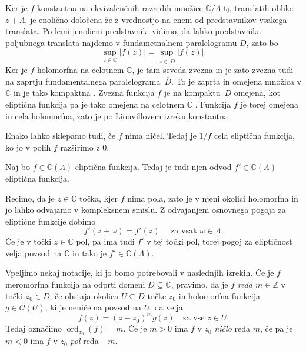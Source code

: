 \documentclass[mat1]{fmfdelo}
\newcommand{\Z}{\mathbb Z}
\newcommand{\C}{\mathbb C}
\newcommand{\elf}{\C(\Lambda)}
\newcommand{\ord}[2]{\operatorname{ord}_{#1}(#2)}
\newcommand{\hol}[1]{\mathcal{O}(#1)}
\newcommand{\olsi}[1]{\,\overline{\!{#1}}} %
\theoremstyle{definition}
\begin{document}
\begin{dokaz}
    Ker je $f$ konstantna na ekvivalenčnih razredih množice $\C/\Lambda$ tj. translatih oblike $z + \Lambda$, je enolično določena že z vrednostjo na enem od predstavnikov vsakega translata. Po lemi \ref{enolicni predstavnik} vidimo, da lahko predstavnika poljubnega translata najdemo v fundametnalnem paralelogramu $D$, zato bo 
    \[
        \sup_{z \in \C} \left\lvert f(z) \right\rvert = \sup_{z \in \olsi{D}} \left\lvert f(z) \right\rvert.
    \]
    Ker je $f$ holomorfna na celotnem $\C$, je tam seveda zvezna in je zato zvezna tudi na zaprtju fundamentalnega paralelograma $\olsi{D}$. To je zaprta in omejena množica v $\C$ in je tako kompaktna \cite[Trditev 2.22]{MrcunTop}. Zvezna funkcija $f$ je na kompaktu $\olsi{D}$ omejena, kot eliptična funkcija pa je tako omejena na celotnem $\C$ \cite[Posledica 2.28]{MrcunTop}. Funkcija $f$ je torej omejena in cela holomorfna, zato je po Liouvillovem izreku konstantna.  
\end{dokaz}

\begin{opomba}
    Enako lahko sklepamo tudi, če $f$ nima ničel. Tedaj je $1/f$ cela eliptična funkcija, ko jo v polih $f$ razširimo z $0$.
\end{opomba}

\begin{lema}
    \label{odvod el. funkcije}
    Naj bo $f \in \elf$ eliptična funkcija. Tedaj je tudi njen odvod $f' \in \elf$ eliptična funkcija.
\end{lema}

\begin{dokaz}
    Recimo, da je $z \in \C$ točka, kjer $f$ nima pola, zato je v njeni okolici holomorfna in jo lahko odvajamo v kompleksnem smislu. Z odvajanjem osnovnega pogoja za eliptične funkcije dobimo
    \[
        f'(z + \omega) = f'(z) \quad \text{ za vsak $\omega \in \Lambda$.}
    \]
    Če je v točki $z \in \C$ pol, pa ima tudi $f'$ v tej točki pol, torej pogoj za eliptičnost velja povsod na $\C$ in tako je $f' \in \elf$.
\end{dokaz}

Vpeljimo nekaj notacije, ki jo bomo potrebovali v naslednjih izrekih. Če je $f$ meromorfna funkcija na odprti domeni $D \subseteq \C$, pravimo, da je $f$ \emph{reda $m \in \Z$} v točki $z_0 \in D$, če obstaja okolica $U \subseteq D$ točke $z_0$ in holomorfna funkcija $g \in \hol{U}$, ki je neničelna povsod na $U$, da velja 
\[
    f(z) = (z - z_0)^m g(z) \quad \text{za vse $z \in U$.}  
\]   
Tedaj označimo $\ord{z_0}{f} = m$. Če je $m > 0$ ima $f$ v $z_0$ \emph{ničlo} reda $m$, če pa je $m < 0$ ima $f$ v $z_0$ \emph{pol} reda $-m$.
\end{document}
